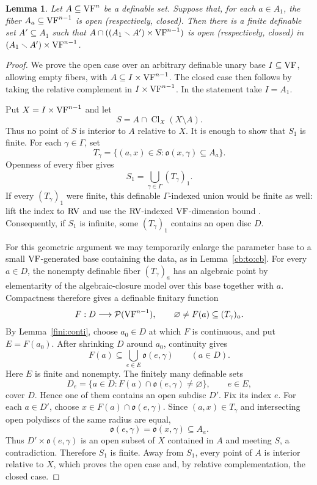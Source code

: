 \documentclass[12pt]{amsart}
\theoremstyle{plain}
\newtheorem{lem}[thm]{Lemma}
\theoremstyle{definition}
\theoremstyle{remark}
\numberwithin{equation}{section}
\theoremstyle{plain}
\newcommand{\VF}{\textup{VF}}
\newcommand{\RV}{\textup{RV}}
\newcommand{\go}{\mathfrak{o}}
\newcommand{\0}{\emptyset}
\newcommand{\mdl}[1]{\mathcal{#1}}  %
\newcommand{\fun}{\longrightarrow}
\newcommand{\sub}{\subseteq}
\newcommand{\mi}{\smallsetminus}
\DeclareMathOperator{\Cl}{Cl}
\begin{document}
\begin{lem}\label{lem:open:fiberwise}
Let $A\subseteq \VF^n$ be a definable set. Suppose that, for each $a \in A_1$, the fiber $A_a \sub \VF^{n-1}$ is open (respectively, closed). Then there is a finite definable set $A' \subseteq A_1$ such that $A\cap ((A_1 \mi A')\times \VF^{n-1})$ is open (respectively, closed) in $(A_1 \mi A')\times \VF^{n-1}$.
\end{lem}
\begin{proof}
We prove the open case over an arbitrary definable unary base $I\subseteq\VF$, allowing empty fibers, with $A\subseteq I\times\VF^{n-1}$. The closed case then follows by taking the relative complement in $I\times\VF^{n-1}$. In the statement take $I=A_1$.

Put $X=I\times\VF^{n-1}$ and let
\[
S=A\cap\Cl_X(X\setminus A).
\]
Thus no point of $S$ is interior to $A$ relative to $X$. It is enough to show that $S_1$ is finite. For each $\gamma\in\Gamma$, set
\[
T_\gamma=\{(a,x)\in S:\go(x,\gamma)\subseteq A_a\}.
\]
Openness of every fiber gives
\[
S_1=\bigcup_{\gamma\in\Gamma}(T_\gamma)_1.
\]
If every $(T_\gamma)_1$ were finite, this definable $\Gamma$-indexed union would be finite as well: lift the index to $\RV$ and use the $\RV$-indexed $\VF$-dimension bound \cite[Lemma~4.3]{Yin:special:trans}. Consequently, if $S_1$ is infinite, some $(T_\gamma)_1$ contains an open disc $D$.

For this geometric argument we may temporarily enlarge the parameter base to a small $\VF$-generated base containing the data, as in Lemma~\ref{cb:to:cb}. For every $a\in D$, the nonempty definable fiber $(T_\gamma)_a$ has an algebraic point by elementarity of the algebraic-closure model over this base together with $a$. Compactness therefore gives a definable finitary function
\[
F:D\fun\mdl P(\VF^{n-1}),\qquad
\varnothing\ne F(a)\subseteq(T_\gamma)_a.
\]
By Lemma~\ref{fini:conti}, choose $a_0\in D$ at which $F$ is continuous, and put $E=F(a_0)$. After shrinking $D$ around $a_0$, continuity gives
\[
F(a)\subseteq\bigcup_{e\in E}\go(e,\gamma)\qquad(a\in D).
\]
Here $E$ is finite and nonempty. The finitely many definable sets
\[
D_e=\{a\in D:F(a)\cap\go(e,\gamma)\ne\varnothing\},\qquad e\in E,
\]
cover $D$. Hence one of them contains an open subdisc $D'$. Fix its index $e$. For each $a\in D'$, choose $x\in F(a)\cap\go(e,\gamma)$. Since $(a,x)\in T_\gamma$ and intersecting open polydiscs of the same radius are equal,
\[
\go(e,\gamma)=\go(x,\gamma)\subseteq A_a.
\]
Thus $D'\times\go(e,\gamma)$ is an open subset of $X$ contained in $A$ and meeting $S$, a contradiction. Therefore $S_1$ is finite. Away from $S_1$, every point of $A$ is interior relative to $X$, which proves the open case and, by relative complementation, the closed case.
\end{proof}
\end{document}
